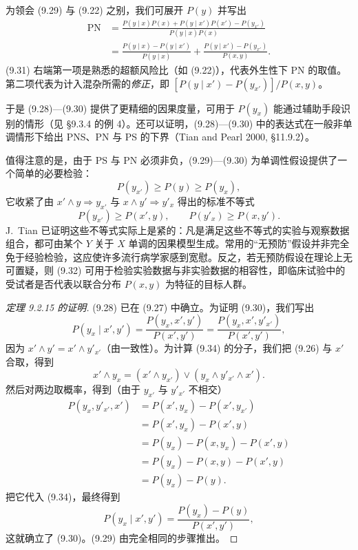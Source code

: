 为领会 \textup{(9.29)} 与 \textup{(9.22)} 之别，我们可展开 $P(y)$ 并写出
\begin{equation}
\begin{aligned}
\mathrm{PN} &= \frac{P(y\mid x)P(x)+P(y\mid x')P(x')-P(y_{x'})}{P(y\mid x)P(x)}\\
&= \frac{P(y\mid x)-P(y\mid x')}{P(y\mid x)}+\frac{P(y\mid x')-P(y_{x'})}{P(x,y)}.
\end{aligned} \tag{9.31}
\end{equation}
\textup{(9.31)} 右端第一项是熟悉的超额风险比（如 \textup{(9.22)}），代表外生性下 PN 的取值。第二项代表为计入混杂所需的\emph{修正}，即 $[P(y\mid x')-P(y_{x'})]/P(x,y)$。

于是 \textup{(9.28)}—\textup{(9.30)} 提供了更精细的因果度量，可用于 $P(y_x)$ 能通过辅助手段识别的情形（见 \S 9.3.4 的例 4）。还可以证明，\textup{(9.28)}—\textup{(9.30)} 中的表达式在一般非单调情形下给出 PNS、PN 与 PS 的下界（Tian and Pearl 2000, \S 11.9.2）。

值得注意的是，由于 PS 与 PN 必须非负，\textup{(9.29)}—\textup{(9.30)} 为单调性假设提供了一个简单的必要检验：
\begin{equation}
P(y_{x'})\ge P(y)\ge P(y_x), \tag{9.32}
\end{equation}
它收紧了由 $x'\wedge y\Rightarrow y_{x'}$ 与 $x\wedge y'\Rightarrow y'_x$ 得出的标准不等式
\begin{equation}
P(y_{x'})\ge P(x',y),\qquad P(y'_x)\ge P(x,y'). \tag{9.33}
\end{equation}
J.~Tian 已证明这些不等式实际上是紧的：凡是满足这些不等式的实验与观察数据组合，都可由某个 $Y$ 关于 $X$ 单调的因果模型生成。常用的“无预防”假设并非完全免于经验检验，这应使许多流行病学家感到宽慰。反之，若无预防假设在理论上无可置疑，则 \textup{(9.32)} 可用于检验实验数据与非实验数据的相容性，即临床试验中的受试者是否代表以联合分布 $P(x,y)$ 为特征的目标人群。

\begin{proof}[定理 9.2.15 的证明]
\textup{(9.28)} 已在 \textup{(9.27)} 中确立。为证明 \textup{(9.30)}，我们写出
\begin{equation}
P(y_x\mid x',y')=\frac{P(y_x,x',y')}{P(x',y')}=\frac{P(y_x,x',y'_{x'})}{P(x',y')}, \tag{9.34}
\end{equation}
因为 $x'\wedge y'=x'\wedge y'_{x'}$（由一致性）。为计算 \textup{(9.34)} 的分子，我们把 \textup{(9.26)} 与 $x'$ 合取，得到
\[
x'\wedge y_x=(x'\wedge y_{x'})\vee(y_x\wedge y'_{x'}\wedge x').
\]
然后对两边取概率，得到（由于 $y_{x'}$ 与 $y'_{x'}$ 不相交）
\begin{align*}
P(y_x,y'_{x'},x') &= P(x',y_x)-P(x',y_{x'})\\
&= P(x',y_x)-P(x',y)\\
&= P(y_x)-P(x,y_x)-P(x',y)\\
&= P(y_x)-P(x,y)-P(x',y)\\
&= P(y_x)-P(y).
\end{align*}
把它代入 \textup{(9.34)}，最终得到
\[
P(y_x\mid x',y')=\frac{P(y_x)-P(y)}{P(x',y')},
\]
这就确立了 \textup{(9.30)}。\textup{(9.29)} 由完全相同的步骤推出。
\end{proof}

